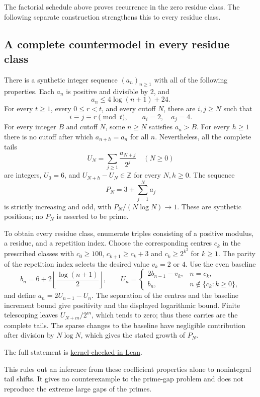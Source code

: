 \documentclass[11pt]{article}
\begin{document}
The factorial schedule above proves recurrence in the zero residue class.
The following separate construction strengthens this to every residue class.


\subsection{A complete countermodel in every residue class}
\label{long251:res:all-residue-log-countermodel}
There is a synthetic integer sequence $(a_n)_{n\ge1}$ with all of the
following properties.  Each $a_n$ is positive and divisible by $2$, and
\[
 a_n\le 4\log(n+1)+24.
\]
For every $t\ge1$, every $0\le r<t$, and every cutoff $N$, there are
$i,j\ge N$ such that
\[
 i\equiv j\equiv r\pmod t,\qquad a_i=2,\quad a_j=4.
\]
For every integer $B$ and cutoff $N$, some $n\ge N$ satisfies $a_n>B$.
For every $h\ge1$ there is no cutoff after which $a_{n+h}=a_n$ for all $n$.
Nevertheless, all the complete tails
\[
 U_N=\sum_{j\ge1}\frac{a_{N+j}}{2^j}\quad(N\ge0)
\]
are integers, $U_0=6$, and $U_{N+h}-U_N\in\mathbb Z$ for every $N,h\ge0$.
The sequence
\[
 P_N=3+\sum_{j=1}^{N}a_j
\]
is strictly increasing and odd, with $P_N/(N\log N)\to1$.
These are synthetic positions; no $P_N$ is asserted to be prime.

To obtain every residue class, enumerate triples consisting of a positive
modulus, a residue, and a repetition index.  Choose the corresponding
centres $c_k$ in the prescribed classes with $c_0\ge100$,
$c_{k+1}\ge c_k+3$ and $c_k\ge2^{k^2}$ for $k\ge1$.
The parity of the repetition index selects the desired value $v_k=2$ or $4$.
Use the even baseline
\[
 b_n=6+2\left\lfloor\frac{\log(n+1)}2\right\rfloor,
 \qquad
 U_n=\begin{cases}2b_{n-1}-v_k,&n=c_k,\\b_n,&n\notin\{c_k:k\ge0\},\end{cases}
\]
and define $a_n=2U_{n-1}-U_n$.  The separation of the centres and the
baseline increment bound give positivity and the displayed logarithmic
bound.  Finite telescoping leaves $U_{N+m}/2^m$, which tends to zero;
thus these carries are the complete tails.  The sparse changes to the
baseline have negligible contribution after division by $N\log N$,
which gives the stated growth of $P_N$.

The full statement is \href{https://github.com/wcook04/plectis-erdos/blob/d4fed71423840f70f10edf27b9ad27c22fc4f49a/ErdosProblems/Erdos251/AllResidueLogarithmicR9.lean#L503}{kernel-checked in Lean}.


This rules out an inference from these coefficient properties alone to
nonintegral tail shifts.  It gives no counterexample to the prime-gap problem
and does not reproduce the extreme large gaps of the primes.
\end{document}

